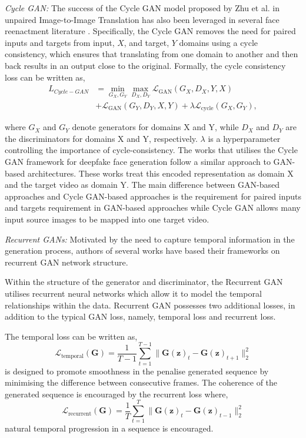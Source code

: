 \textit{Cycle GAN:} The success of the Cycle GAN model proposed by Zhu et al. \cite{zhu2017unpaired} in unpaired Image-to-Image Translation has also been leveraged in several face reenactment literature \cite{wu2018reenactgan, xu2017face}. Specifically, the Cycle GAN removes the need for paired inputs and targets from input, $X$, and target, $Y$ domains using a cycle consistency, which ensures that translating from one domain to another and then back results in an output close to the original. Formally, the cycle consistency loss can be written as,
\begin{equation}
\begin{split}
  L_{Cycle-GAN} & = \min_{G_X, G_Y} \max_{D_X, D_Y} \mathcal{L}_{\text{GAN}}(G_X, D_X, Y, X) \\ & + \mathcal{L}_{\text{GAN}}(G_Y, D_Y, X, Y) + \lambda \mathcal{L}_{\text{cycle}}(G_X, G_Y),
\end{split}
\end{equation}

where $G_X$ and $G_Y$ denote generators for domains X and Y, while 
$D_X$ and $D_Y$ are the discriminators for domains X and Y, respectively. $\lambda$ is a hyperparameter controlling the importance of cycle-consistency. The works that utilises the Cycle GAN framework for deepfake face generation follow a similar approach to GAN-based architectures. These works treat this encoded representation as domain X and the target video as domain Y. The main difference between GAN-based approaches and Cycle GAN-based approaches is the requirement for paired inputs and targets requirement in GAN-based approaches while Cycle GAN allows many input source images to be mapped into one target video.

\textit{Recurrent GANs:} Motivated by the need to capture temporal information in the generation process, authors of several works have based their frameworks on recurrent GAN network structure.

Within the structure of the generator and discriminator, the Recurrent GAN utilises recurrent neural networks which allow it to model the temporal relationships within the data. Recurrent GAN possesses two additional losses, in addition to the typical GAN loss, namely, temporal loss and recurrent loss. 

The temporal loss can be written as, 
\begin{equation}
\mathcal{L}_{\text{temporal}}(\textbf{G}) = \frac{1}{T-1}\sum_{t=1}^{T-1} \| \textbf{G}(\textbf{z})_t - \textbf{G}(\textbf{z})_{t+1} \|_2^2
\end{equation}
is designed to promote smoothness in the penalise generated sequence by minimising the difference between consecutive frames. The coherence of the generated sequence is encouraged by the recurrent loss where,
\begin{equation}
\mathcal{L}_{\text{recurrent}}(\textbf{G}) = \frac{1}{T}\sum_{t=1}^{T} \| \textbf{G}(\textbf{z})_t - \textbf{G}(\textbf{z})_{t-1} \|_2^2
\end{equation}
natural temporal progression in a sequence is encouraged.

